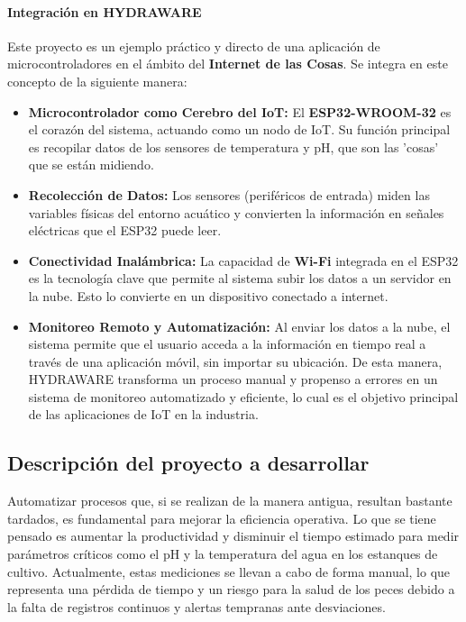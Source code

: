 \documentclass[a4paper,12pt]{article}
\begin{document}
	\paragraph{Integración en HYDRAWARE}
	Este proyecto es un ejemplo práctico y directo de una aplicación de microcontroladores en el ámbito del \textbf{Internet de las Cosas}. Se integra en este concepto de la siguiente manera:
	\begin{itemize}
		\item \textbf{Microcontrolador como Cerebro del IoT:} El \textbf{ESP32-WROOM-32} es el corazón del sistema, actuando como un nodo de IoT. Su función principal es recopilar datos de los sensores de temperatura y pH, que son las 'cosas' que se están midiendo.
		\item \textbf{Recolección de Datos:} Los sensores (periféricos de entrada) miden las variables físicas del entorno acuático y convierten la información en señales eléctricas que el ESP32 puede leer.
		\item \textbf{Conectividad Inalámbrica:} La capacidad de \textbf{Wi-Fi} integrada en el ESP32 es la tecnología clave que permite al sistema subir los datos a un servidor en la nube. Esto lo convierte en un dispositivo conectado a internet.
		\item \textbf{Monitoreo Remoto y Automatización:} Al enviar los datos a la nube, el sistema permite que el usuario acceda a la información en tiempo real a través de una aplicación móvil, sin importar su ubicación. De esta manera, HYDRAWARE transforma un proceso manual y propenso a errores en un sistema de monitoreo automatizado y eficiente, lo cual es el objetivo principal de las aplicaciones de IoT en la industria.
	\end{itemize}
	

	
	
	\subsection{Descripción del proyecto a desarrollar}
	Automatizar procesos que, si se realizan de la manera antigua, resultan bastante tardados, es fundamental para mejorar la eficiencia operativa. Lo que se tiene pensado es aumentar la productividad y disminuir el tiempo estimado para medir parámetros críticos como el pH y la temperatura del agua en los estanques de cultivo. Actualmente, estas mediciones se llevan a cabo de forma manual, lo que representa una pérdida de tiempo y un riesgo para la salud de los peces debido a la falta de registros continuos y alertas tempranas ante desviaciones.
	
\end{document}
